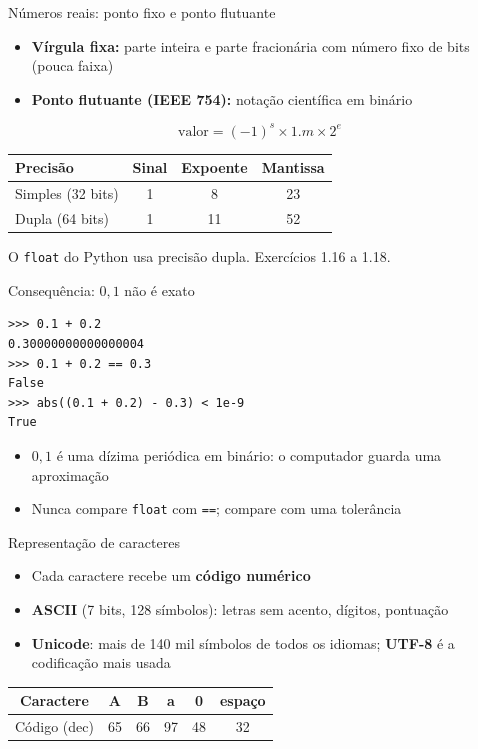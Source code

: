 \documentclass[aspectratio=169,10pt,t]{beamer}
\begin{document}
\begin{frame}{Números reais: ponto fixo e ponto flutuante}
  \begin{itemize}
    \item \textbf{Vírgula fixa:} parte inteira e parte fracionária com número fixo de bits (pouca faixa)
    \item \textbf{Ponto flutuante (IEEE 754):} notação científica em binário
  \end{itemize}
  \[ \text{valor} = (-1)^{s}\times 1.m \times 2^{e} \]
  \begin{center}\small
    \begin{tabular}{lccc}
      \toprule
      Precisão & Sinal & Expoente & Mantissa\\
      \midrule
      Simples (32 bits) & 1 & 8 & 23\\
      Dupla (64 bits) & 1 & 11 & 52\\
      \bottomrule
    \end{tabular}
  \end{center}
  \footnotesize O \texttt{float} do Python usa precisão dupla. Exercícios 1.16 a 1.18.
\end{frame}

\begin{frame}[fragile]{Consequência: $0{,}1$ não é exato}
\begin{lstlisting}
>>> 0.1 + 0.2
0.30000000000000004
>>> 0.1 + 0.2 == 0.3
False
>>> abs((0.1 + 0.2) - 0.3) < 1e-9
True
\end{lstlisting}
  \begin{itemize}
    \item \(0{,}1\) é uma dízima periódica em binário: o computador guarda uma aproximação
    \item Nunca compare \texttt{float} com \texttt{==}; compare com uma \alert{tolerância}
  \end{itemize}
\end{frame}

\begin{frame}{Representação de caracteres}
  \begin{itemize}
    \item Cada caractere recebe um \textbf{código numérico}
    \item \textbf{ASCII} (7 bits, 128 símbolos): letras sem acento, dígitos, pontuação
    \item \textbf{Unicode}: mais de 140 mil símbolos de todos os idiomas; \textbf{UTF-8} é a codificação mais usada
  \end{itemize}
  \centering\small
  \begin{tabular}{cccccc}
    \toprule
    Caractere & A & B & a & 0 & espaço\\
    \midrule
    Código (dec) & 65 & 66 & 97 & 48 & 32\\
    \bottomrule
  \end{tabular}
\end{frame}
\end{document}
